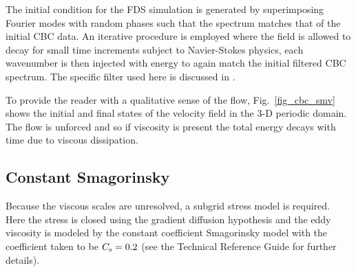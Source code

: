 \documentclass[11pt]{book}
\begin{document}
The initial condition for the FDS simulation is generated by superimposing Fourier modes with random phases such that the spectrum matches that of the initial CBC data.  An iterative procedure is employed where the field is allowed to decay for small time increments subject to Navier-Stokes physics, each wavenumber is then injected with energy to again match the initial filtered CBC spectrum.  The specific filter used here is discussed in \cite{McDermott:2005b}.

To provide the reader with a qualitative sense of the flow, Fig.~\ref{fig_cbc_smv} shows the initial and final states of the velocity field in the 3-D periodic domain.  The flow is unforced and so if viscosity is present the total energy decays with time due to viscous dissipation.

\subsection{Constant Smagorinsky}

Because the viscous scales are unresolved, a subgrid stress model is required. Here the stress is closed using the gradient diffusion hypothesis and the eddy viscosity is modeled by the constant coefficient Smagorinsky model with the coefficient taken to be $C_{\rm s} = 0.2$ (see the Technical Reference Guide for further details).
\end{document}
